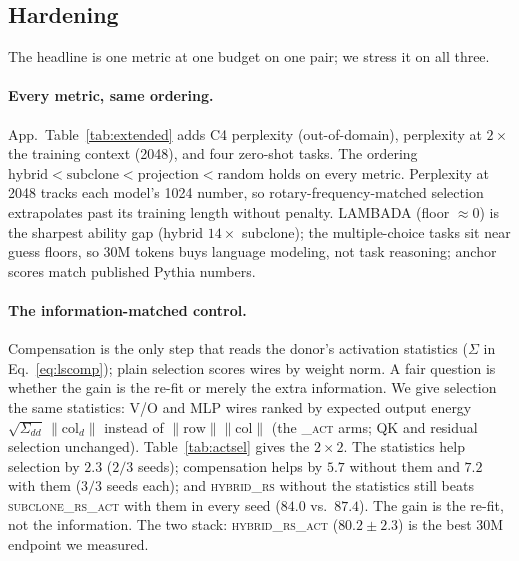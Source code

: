 \ificlrcompact\else\AlgCompSel\fi   %

\subsection{Hardening}
\label{sec:race:hardening}

The headline is one metric at one budget on one pair; we stress it on all three.

\paragraph{Every metric, same ordering.}
App.~Table~\ref{tab:extended} adds C4 perplexity (out-of-domain), perplexity at
$2\times$ the training context (2048), and four zero-shot tasks. The ordering
$\text{hybrid} < \text{subclone} < \text{projection} < \text{random}$ holds on
every metric. Perplexity at 2048 tracks each model's 1024 number, so
rotary-frequency-matched selection extrapolates past its training length without
penalty. LAMBADA (floor $\approx0$) is the sharpest ability gap (hybrid
$14\times$ subclone); the multiple-choice tasks sit near guess floors, so 30M
tokens buys language modeling, not task reasoning; anchor scores match published
Pythia numbers.

\paragraph{The information-matched control.}
Compensation is the only step that reads the donor's activation statistics
($\Sigma$ in Eq.~\ref{eq:lscomp}); plain selection scores wires by weight norm.
A fair question is whether the gain is the re-fit or merely the extra
information. We give selection the same statistics: V/O and MLP wires ranked by
expected output energy $\sqrt{\Sigma_{dd}}\,\lVert\mathrm{col}_d\rVert$ instead
of $\lVert\mathrm{row}\rVert\lVert\mathrm{col}\rVert$ (the \textsc{\_act} arms;
QK and residual selection unchanged). Table~\ref{tab:actsel} gives the
$2\times2$. The statistics help selection by $2.3$ ($2/3$ seeds); compensation
helps by $5.7$ without them and $7.2$ with them ($3/3$ seeds each); and
\textsc{hybrid\_rs} without the statistics still beats
\textsc{subclone\_rs\_act} with them in every seed ($84.0$ vs.\ $87.4$). The gain
is the re-fit, not the information. The two stack:
\textsc{hybrid\_rs\_act} ($80.2\pm2.3$) is the best 30M endpoint we measured.

